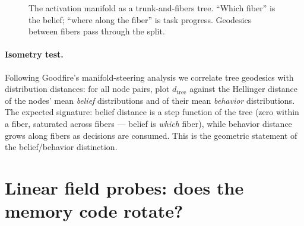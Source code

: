 \documentclass[11pt]{article}
\begin{document}
\begin{figure}[h]
\centering
{}
\caption{The activation manifold as a trunk-and-fibers tree. ``Which fiber''
is the belief; ``where along the fiber'' is task progress. Geodesics between
fibers pass through the split.}
\label{fig:tree}
\end{figure}

\paragraph{Isometry test.} Following Goodfire's manifold-steering analysis we
correlate tree geodesics with distribution distances: for all node pairs, plot
$d_{\mathrm{tree}}$ against the Hellinger distance of the nodes' mean
\emph{belief} distributions and of their mean \emph{behavior} distributions.
The expected signature: belief distance is a step function of the tree (zero
within a fiber, saturated across fibers --- belief is \emph{which} fiber),
while behavior distance grows along fibers as decisions are consumed. This is
the geometric statement of the belief/behavior distinction.

\section{Linear field probes: does the memory code rotate?}
\label{sec:lfp}
\end{document}
